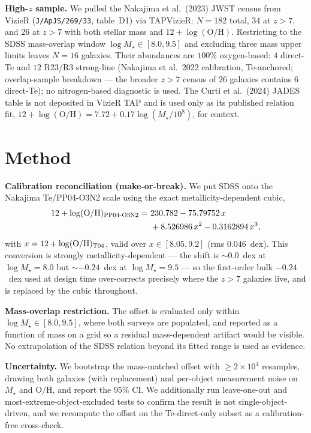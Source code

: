 \documentclass[twocolumn]{aastex631}
\begin{document}
\textbf{High-$z$ sample.} We pulled the Nakajima et al.\ (2023) JWST census from VizieR (\texttt{J/ApJS/269/33}, table~D1) via TAPVizieR: $N=182$ total, $34$ at $z>7$, and $26$ at $z>7$ with both stellar mass and $12+\log(\mathrm{O/H})$. Restricting to the SDSS mass-overlap window $\log M_\star\in[8.0,9.5]$ and excluding three mass upper limits leaves $N=16$ galaxies. Their abundances are $100\%$ oxygen-based: $4$ direct-Te and $12$ R23/R3 strong-line (Nakajima et al.\ 2022 calibration, Te-anchored; overlap-sample breakdown --- the broader $z>7$ census of $26$ galaxies contains $6$ direct-Te); no nitrogen-based diagnostic is used. The Curti et al.\ (2024) JADES table is not deposited in VizieR TAP and is used only as its published relation fit, $12+\log(\mathrm{O/H})=7.72+0.17\log(M_\star/10^{8})$, for context.

\section{Method}
\textbf{Calibration reconciliation (make-or-break).} We put SDSS onto the Nakajima Te/PP04-O3N2 scale using the exact \citet{KewleyEllison2008} metallicity-dependent cubic,
\begin{align}
12+\log(\mathrm{O/H})_{\rm PP04\text{-}O3N2} =\ & 230.782 - 75.79752\,x \nonumber\\
 & + 8.526986\,x^2 - 0.3162894\,x^3,
\end{align}
with $x=12+\log(\mathrm{O/H})_{\rm T04}$, valid over $x\in[8.05,9.2]$ (rms $0.046$~dex). This conversion is strongly metallicity-dependent --- the shift is $\sim0.0$~dex at $\log M_\star=8.0$ but $\sim-0.24$~dex at $\log M_\star=9.5$ --- so the first-order bulk $-0.24$~dex used at design time over-corrects precisely where the $z>7$ galaxies live, and is replaced by the cubic throughout.

\textbf{Mass-overlap restriction.} The offset is evaluated only within $\log M_\star\in[8.0,9.5]$, where both surveys are populated, and reported as a function of mass on a grid so a residual mass-dependent artifact would be visible. No extrapolation of the SDSS relation beyond its fitted range is used as evidence.

\textbf{Uncertainty.} We bootstrap the mass-matched offset with $\geq2\times10^4$ resamples, drawing both galaxies (with replacement) and per-object measurement noise on $M_\star$ and $\mathrm{O/H}$, and report the $95\%$ CI. We additionally run leave-one-out and most-extreme-object-excluded tests to confirm the result is not single-object-driven, and we recompute the offset on the Te-direct-only subset as a calibration-free cross-check.
\end{document}
